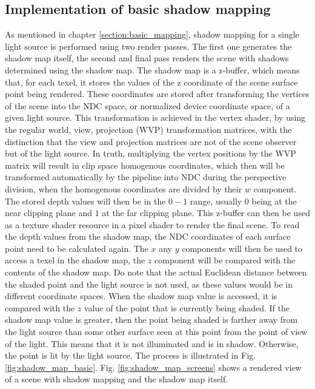 \subsection{Implementation of basic shadow mapping}
\label{section:basic_mapping_impl}
As mentioned in chapter \ref{section:basic_mapping}, shadow mapping for a single light source is performed using two render passes. The first one generates the shadow map itself, the second and final pass renders the scene with shadows determined using the shadow map. The shadow map is a z-buffer, which means that, for each texel, it stores the values of the z coordinate of the scene surface point being rendered. These coordinates are stored after transforming the vertices of the scene into the NDC space, or normalized device coordinate space, of a given light source. This transformation is achieved in the vertex shader, by using the regular world, view, projection (WVP) transformation matrices, with the distinction that the view and projection matrices are not of the scene observer but of the light source. In truth, multiplying the vertex positions by the WVP matrix will result in clip space homogenous coordinates, which then will be transformed automatically by the pipeline into NDC during the perspective division, when the homogenous coordinates are divided by their \(w\) component. The stored depth values will then be in the \(0-1\) range, usually \(0\) being at the near clipping plane and \(1\) at the far clipping plane. This z-buffer can then be used as a texture shader resource in a pixel shader to render the final scene. To read the depth values from the shadow map, the NDC coordinates of each surface point need to be calculated again. The \(x\) any \(y\) components will then be used to access a texel in the shadow map, the \(z\) component will be compared with the contents of the shadow map. Do note that the actual Euclidean distance between the shaded point and the light source is not used, as these values would be in different coordinate spaces. When the shadow map value is accessed, it is compared with the \(z\) value of the point that is currently being shaded. If the shadow map value is greater, then the point being shaded is farther away from the light source than some other surface seen at this point from the point of view of the light. This means that it is not illuminated and is in shadow. Otherwise, the point is lit by the light source. The process is illustrated in Fig. \ref{fig:shadow_map_basic}. Fig. \ref{fig:shadow_map_screens} shows a rendered view of a scene with shadow mapping and the shadow map itself.

